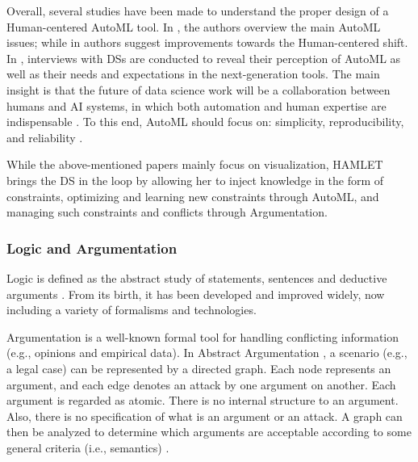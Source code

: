 Overall, several studies have been made to understand the proper design of a Human-centered AutoML tool.
In \cite{pfisterer2019towards}, the authors overview the main AutoML issues; while in \cite{khuat2022roles} authors suggest improvements towards the Human-centered shift.
In \cite{gil2019towards, XinWLSP21automationml, crisan2021fits}, interviews with DSs are conducted to reveal their perception of AutoML as well as their needs and expectations in the next-generation tools.
The main insight is that the future of data science work will be a collaboration between humans and AI systems, in which both automation and human expertise are indispensable \cite{wang2019human}.
To this end, AutoML should focus on: simplicity, reproducibility, and reliability \cite{XinWLSP21automationml, crisan2021fits}.

While the above-mentioned papers mainly focus on visualization, HAMLET brings the DS in the loop by allowing her to inject knowledge in the form of constraints, optimizing and learning new constraints through AutoML, and managing such constraints and conflicts through Argumentation.

\subsubsection{Logic and Argumentation}\label{logic}
Logic is defined as the abstract study of statements, sentences and deductive arguments \cite{Paulson2018logichistory}.
From its birth, it has been developed and improved widely, now including a variety of formalisms and technologies.

Argumentation is a well-known formal tool for handling conflicting information (e.g., opinions and empirical data).
In Abstract Argumentation \cite{Dung1995abstractArg}, a scenario (e.g., a legal case) can be represented by a directed graph.
Each node represents an argument, and each edge denotes an attack by one argument on another. Each argument is regarded as atomic. There is no internal structure to an argument. Also, there is no specification of what is an argument or an attack. A graph can then be analyzed to determine which arguments are acceptable according to some general criteria (i.e., semantics) \cite{baroniCG11semantics}.

